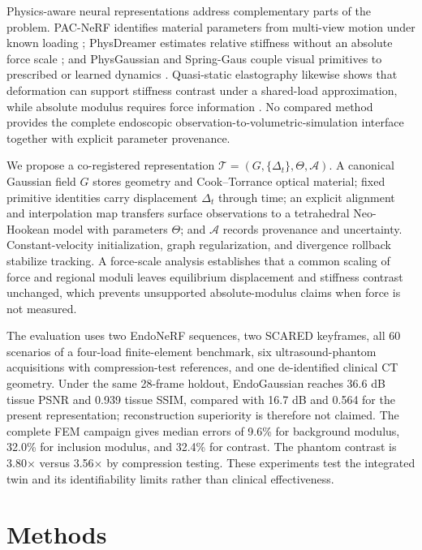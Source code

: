 \documentclass[smallextended]{svjour3}
\begin{document}
Physics-aware neural representations address complementary parts of the
problem. PAC-NeRF identifies material parameters from multi-view motion
under known loading \cite{pacnerf}; PhysDreamer estimates relative
stiffness without an absolute force scale \cite{physdreamer}; and
PhysGaussian and Spring-Gaus couple visual primitives to prescribed or
learned dynamics \cite{physgaussian,springgaus}. Quasi-static
elastography likewise shows that deformation can support stiffness contrast
under a shared-load approximation, while absolute modulus requires force
information \cite{ophir1991,wells2011,sigrist2017}. No compared method
provides the complete endoscopic observation-to-volumetric-simulation
interface together with explicit parameter provenance.

We propose a co-registered representation
$\mathcal{T}=(G,\{\Delta_t\},\Theta,\mathcal{A})$. A canonical
Gaussian field $G$ stores geometry and Cook--Torrance optical material;
fixed primitive identities carry displacement $\Delta_t$ through time; an
explicit alignment and interpolation map transfers surface observations to
a tetrahedral Neo-Hookean model with parameters $\Theta$; and
$\mathcal{A}$ records provenance and uncertainty. Constant-velocity
initialization, graph regularization, and divergence rollback stabilize
tracking. A force-scale analysis establishes that a common scaling of force
and regional moduli leaves equilibrium displacement and stiffness contrast
unchanged, which prevents unsupported absolute-modulus claims when force is
not measured.

The evaluation uses two EndoNeRF sequences, two SCARED keyframes, all 60
scenarios of a four-load finite-element benchmark, six ultrasound-phantom
acquisitions with compression-test references, and one de-identified
clinical CT geometry. Under the same 28-frame holdout, EndoGaussian reaches
36.6 dB tissue PSNR and 0.939 tissue SSIM, compared with 16.7 dB and 0.564
for the present representation; reconstruction superiority is therefore
not claimed. The complete FEM campaign gives median errors of 9.6\% for
background modulus, 32.0\% for inclusion modulus, and 32.4\% for contrast.
The phantom contrast is 3.80$\times$ versus 3.56$\times$ by compression
testing. These experiments test the integrated twin and its identifiability
limits rather than clinical effectiveness.

\section{Methods}
\label{sec:method}
\end{document}
